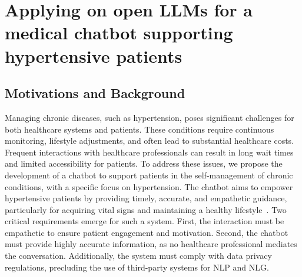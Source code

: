 

\section[RAG on open LLM for medical chatbot]{Applying  on open \glspl{LLM} for a medical chatbot supporting hypertensive patients}\label{sec:applying-rag-on-open-llm-for-a-medical-chatbot-supporting-hypertensive-patients}

\subsection{Motivations and Background}
\label{subsec:motivations-and-background-rag}
%
Managing chronic diseases, such as hypertension, poses significant challenges for both healthcare systems and patients.
%
These conditions require continuous monitoring, lifestyle adjustments, and often lead to substantial healthcare costs.
%
Frequent interactions with healthcare professionals can result in long wait times and limited accessibility for patients.
%
To address these issues, we propose the development of a chatbot to support patients in the self-management of chronic conditions, with a specific focus on hypertension.
%
The chatbot aims to empower hypertensive patients by providing timely, accurate, and empathetic guidance, particularly for acquiring vital signs and maintaining a healthy lifestyle~\cite{telmed2024,llm-goodit2023}.
%
Two critical requirements emerge for such a system.
%
First, the interaction must be empathetic to ensure patient engagement and motivation.
%
Second, the chatbot must provide highly accurate information, as no healthcare professional mediates the conversation.
%
Additionally, the system must comply with data privacy regulations, precluding the use of third-party systems for \gls{NLP} and \gls{NLG}.

